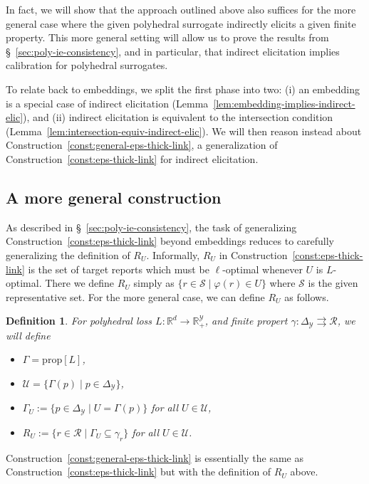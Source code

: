 \documentclass[11pt]{article}
\newcommand{\reals}{\mathbb{R}}
\newcommand{\prop}[1]{\mathrm{prop}[#1]}
\newcommand{\simplex}{\Delta_\Y}
\newcommand{\R}{\mathcal{R}}
\newcommand{\Sc}{\mathcal{S}}
\newcommand{\U}{\mathcal{U}}
\newcommand{\Y}{\mathcal{Y}}
\newcommand{\toto}{\rightrightarrows}
\newtheorem{definition}{Definition}
\begin{document}
In fact, we will show that the approach outlined above also suffices for the more general case where the given polyhedral surrogate indirectly elicits a given finite property.
This more general setting will allow us to prove the results from \S~\ref{sec:poly-ie-consistency}, and in particular, that indirect elicitation implies calibration for polyhedral surrogates.

To relate back to embeddings, we split the first phase into two: (i) an embedding is a special case of indirect elicitation (Lemma~\ref{lem:embedding-implies-indirect-elic}), and (ii) indirect elicitation is equivalent to the intersection condition (Lemma~\ref{lem:intersection-equiv-indirect-elic}).
We will then reason instead about Construction~\ref{const:general-eps-thick-link}, a generalization of Construction~\ref{const:eps-thick-link} for indirect elicitation.

\subsection{A more general construction}

As described in \S~\ref{sec:poly-ie-consistency}, the task of generalizing Construction~\ref{const:eps-thick-link} beyond embeddings reduces to carefully generalizing the definition of $R_U$.
Informally, $R_U$ in Construction~\ref{const:eps-thick-link} is the set of target reports which must be $\ell$-optimal whenever $U$ is $L$-optimal.
There we define $R_U$ simply as $\{r\in\Sc \mid \varphi(r) \in U\}$ where $\Sc$ is the given representative set.
For the more general case, we can define $R_U$ as follows.
\begin{definition}\label{def:general-link-defs}
  For polyhedral loss $L:\reals^d\to\reals^\Y_+$, and finite propert $\gamma:\simplex\toto\R$, we will define
  \begin{itemize}
  \item $\Gamma = \prop L$,
  \item $\U = \{\Gamma(p) \mid p \in \simplex\}$,
  \item $\Gamma_U := \{p\in\simplex \mid U = \Gamma(p)\}$ for all $U \in \U$,
  \item $R_U := \{r\in\R \mid \Gamma_U \subseteq \gamma_r\}$ for all $U \in \U$.
  \end{itemize}
\end{definition}

Construction~\ref{const:general-eps-thick-link} is essentially the same as Construction~\ref{const:eps-thick-link} but with the definition of $R_U$ above.
\end{document}
